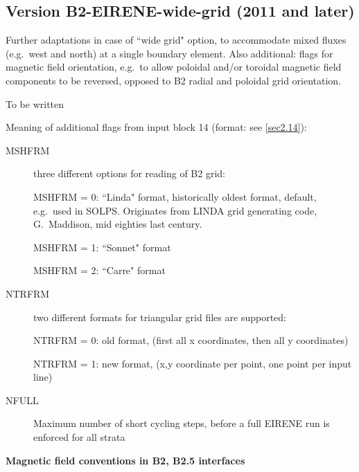 \subsection{Version B2-EIRENE-wide-grid (2011 and later)} \label{sec2.14.3}

Further adaptations in case of ``wide grid" option, to accommodate   mixed
fluxes (e.g.\ west and north) at a single boundary element.
Also additional: flags for magnetic field orientation, e.g.\ to allow poloidal
and/or toroidal magnetic field components to be reversed, opposed to B2 radial
and poloidal grid orientation.

To be written 

Meaning of additional flags from input block 14  (format: see \cref{sec2.14}):
\begin{description}
  \item[MSHFRM] three different options for reading of B2 grid:

        MSHFRM = 0: ``Linda" format, historically oldest format, default, e.g.\ used in
        SOLPS.
        Originates from LINDA grid generating code, G.~Maddison, mid eighties last
        century.

        MSHFRM = 1: ``Sonnet" format 

        MSHFRM = 2: ``Carre" format 

  \item[NTRFRM] two different formats for triangular grid files are supported:

        NTRFRM = 0:  old format, (first all x coordinates, then all y coordinates)

        NTRFRM = 1:  new format, (x,y coordinate per point, one point per input line)
  \item[NFULL] Maximum number of short cycling steps, before a full EIRENE run is
        enforced for all strata
\end{description}

\textbf{Magnetic field conventions in B2, B2.5 interfaces} 

\medskip 

